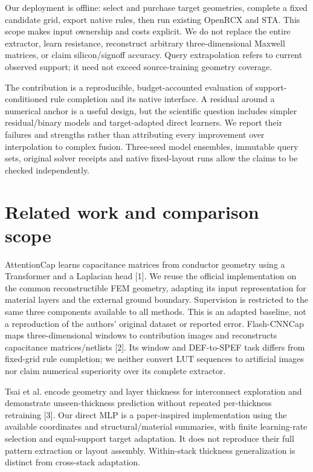 \documentclass[10pt,twocolumn]{article}
\begin{document}
Our deployment is offline: select and purchase target geometries, complete a fixed candidate grid, export native rules, then run existing OpenRCX and STA. This scope makes input ownership and costs explicit. We do not replace the entire extractor, learn resistance, reconstruct arbitrary three-dimensional Maxwell matrices, or claim silicon/signoff accuracy. Query extrapolation refers to current observed support; it need not exceed source-training geometry coverage.

The contribution is a reproducible, budget-accounted evaluation of support-conditioned rule completion and its native interface. A residual around a numerical anchor is a useful design, but the scientific question includes simpler residual/binary models and target-adapted direct learners. We report their failures and strengths rather than attributing every improvement over interpolation to complex fusion. Three-seed model ensembles, immutable query sets, original solver receipts and native fixed-layout runs allow the claims to be checked independently.

\section*{Related work and comparison scope}

AttentionCap learns capacitance matrices from conductor geometry using a Transformer and a Laplacian head [1]. We reuse the official implementation on the common reconstructible FEM geometry, adapting its input representation for material layers and the external ground boundary. Supervision is restricted to the same three components available to all methods. This is an adapted baseline, not a reproduction of the authors' original dataset or reported error. Flash-CNNCap maps three-dimensional windows to contribution images and reconstructs capacitance matrices/netlists [2]. Its window and DEF-to-SPEF task differs from fixed-grid rule completion; we neither convert LUT sequences to artificial images nor claim numerical superiority over its complete extractor.

Tsai et al. encode geometry and layer thickness for interconnect exploration and demonstrate unseen-thickness prediction without repeated per-thickness retraining [3]. Our direct MLP is a paper-inspired implementation using the available coordinates and structural/material summaries, with finite learning-rate selection and equal-support target adaptation. It does not reproduce their full pattern extraction or layout assembly. Within-stack thickness generalization is distinct from cross-stack adaptation.
\end{document}
